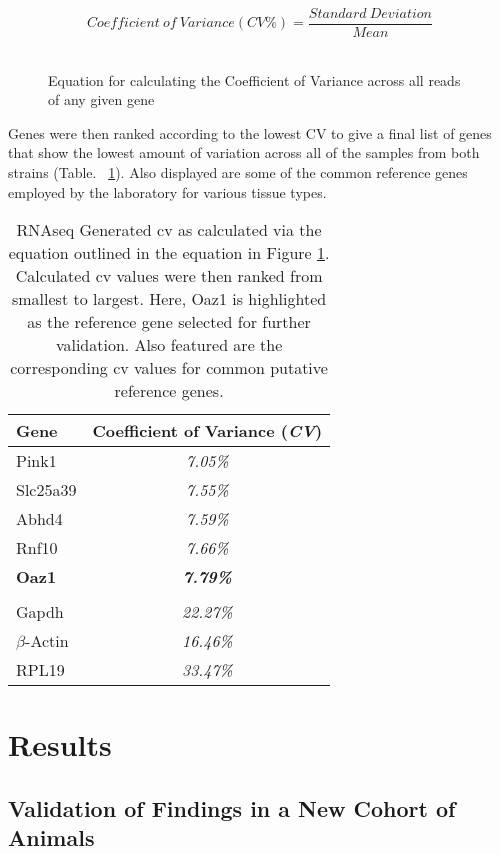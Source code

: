 \begin{figure}[!hbtp]
\large
\[Coefficient\ of\ Variance (CV\%) = \frac{Standard\ Deviation}{Mean}\]\\
\normalsize
\caption[Equation for calculating the Coefficient of Variance]{Equation for calculating the Coefficient of Variance across all reads of any given gene}
\label{eq:cv}
\end{figure}

Genes were then ranked according to the lowest CV to give a final list of genes that show the lowest amount of variation across all of the samples from both strains (Table. ~\ref{table:RNAseqGenCV}). Also displayed are some of the common reference genes employed by the laboratory for various tissue types.

\begin{table}[!hbtp]
\small
\centering
\begin{tabular}{l | c}
Gene  & Coefficient of Variance (\textit{CV}) \\
\hline
Pink1 & \textit{7.05\%} \\
Slc25a39 & \textit{7.55\%} \\
Abhd4 &  \textit{7.59\%} \\
Rnf10 &  \textit{7.66\%} \\
\textbf{Oaz1} &  \textbf{\textit{7.79\%}} \\
 & \\
Gapdh &  \textit{22.27\%} \\
$\beta$-Actin &  \textit{16.46\%} \\
RPL19 &  \textit{33.47\%} \\
\end{tabular}
\caption[RNAseq Generated Coefficient of Variance for selecting new reference genes]{RNAseq Generated \acrfull{cv} as calculated via the equation outlined in the equation in Figure \ref{eq:cv}. Calculated \acrshort{cv} values were then ranked from smallest to largest. Here, Oaz1 is highlighted as the reference gene selected for further validation. Also featured are the corresponding \acrshort{cv} values for common putative reference genes.} 
\label{table:RNAseqGenCV}	
\end{table}

\section{Results}

\subsection{Validation of Findings in a New Cohort of Animals}

